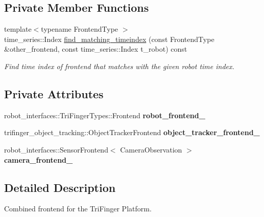 \subsection*{Private Member Functions}
\begin{DoxyCompactItemize}
\item 
{\footnotesize template$<$typename Frontend\+Type $>$ }\\time\+\_\+series\+::\+Index \hyperlink{classrobot__fingers_1_1TriFingerPlatformFrontend_a4c67fd3d8d1e887ed0f5b1b8ec2d30b3}{find\+\_\+matching\+\_\+timeindex} (const Frontend\+Type \&other\+\_\+frontend, const time\+\_\+series\+::\+Index t\+\_\+robot) const
\begin{DoxyCompactList}\small\item\em Find time index of frontend that matches with the given robot time index. \end{DoxyCompactList}\end{DoxyCompactItemize}
\subsection*{Private Attributes}
\begin{DoxyCompactItemize}
\item 
\mbox{\label{classrobot__fingers_1_1TriFingerPlatformFrontend_aa8cef15571ffada758d86370b86b8777}} 
robot\+\_\+interfaces\+::\+Tri\+Finger\+Types\+::\+Frontend {\bfseries robot\+\_\+frontend\+\_\+}
\item 
\mbox{\label{classrobot__fingers_1_1TriFingerPlatformFrontend_a7475483ecc42aba5910e7b3bceeecde3}} 
trifinger\+\_\+object\+\_\+tracking\+::\+Object\+Tracker\+Frontend {\bfseries object\+\_\+tracker\+\_\+frontend\+\_\+}
\item 
\mbox{\label{classrobot__fingers_1_1TriFingerPlatformFrontend_a075fa9bb1d76bbb47955e2ce6126a0e9}} 
robot\+\_\+interfaces\+::\+Sensor\+Frontend$<$ Camera\+Observation $>$ {\bfseries camera\+\_\+frontend\+\_\+}
\end{DoxyCompactItemize}


\subsection{Detailed Description}
Combined frontend for the Tri\+Finger Platform. 


